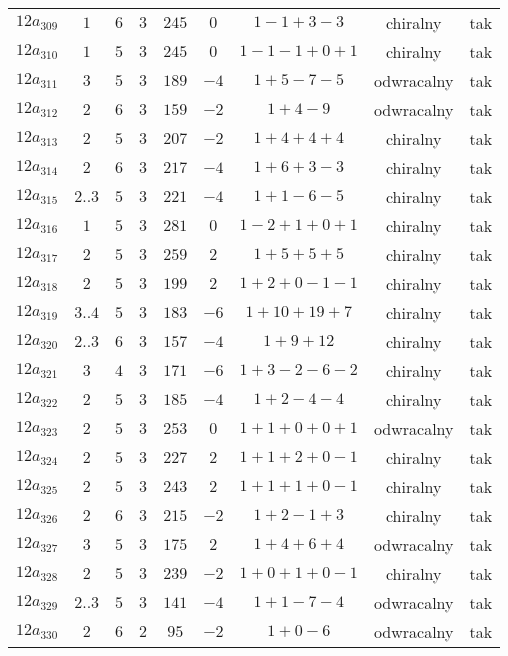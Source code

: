\begin{longtable}{ccccccccc}
$12a_{309}$ & $1$ & $6$ & $3$ & $245$ & $0$ & $1-1+3-3$ & chiralny & tak \\
$12a_{310}$ & $1$ & $5$ & $3$ & $245$ & $0$ & $1-1-1+0+1$ & chiralny & tak \\
$12a_{311}$ & $3$ & $5$ & $3$ & $189$ & $-4$ & $1+5-7-5$ & odwracalny & tak \\
$12a_{312}$ & $2$ & $6$ & $3$ & $159$ & $-2$ & $1+4-9$ & odwracalny & tak \\
$12a_{313}$ & $2$ & $5$ & $3$ & $207$ & $-2$ & $1+4+4+4$ & chiralny & tak \\
$12a_{314}$ & $2$ & $6$ & $3$ & $217$ & $-4$ & $1+6+3-3$ & chiralny & tak \\
$12a_{315}$ & $2..3$ & $5$ & $3$ & $221$ & $-4$ & $1+1-6-5$ & chiralny & tak \\
$12a_{316}$ & $1$ & $5$ & $3$ & $281$ & $0$ & $1-2+1+0+1$ & chiralny & tak \\
$12a_{317}$ & $2$ & $5$ & $3$ & $259$ & $2$ & $1+5+5+5$ & chiralny & tak \\
$12a_{318}$ & $2$ & $5$ & $3$ & $199$ & $2$ & $1+2+0-1-1$ & chiralny & tak \\
$12a_{319}$ & $3..4$ & $5$ & $3$ & $183$ & $-6$ & $1+10+19+7$ & chiralny & tak \\
$12a_{320}$ & $2..3$ & $6$ & $3$ & $157$ & $-4$ & $1+9+12$ & chiralny & tak \\
$12a_{321}$ & $3$ & $4$ & $3$ & $171$ & $-6$ & $1+3-2-6-2$ & chiralny & tak \\
$12a_{322}$ & $2$ & $5$ & $3$ & $185$ & $-4$ & $1+2-4-4$ & chiralny & tak \\
$12a_{323}$ & $2$ & $5$ & $3$ & $253$ & $0$ & $1+1+0+0+1$ & odwracalny & tak \\
$12a_{324}$ & $2$ & $5$ & $3$ & $227$ & $2$ & $1+1+2+0-1$ & chiralny & tak \\
$12a_{325}$ & $2$ & $5$ & $3$ & $243$ & $2$ & $1+1+1+0-1$ & chiralny & tak \\
$12a_{326}$ & $2$ & $6$ & $3$ & $215$ & $-2$ & $1+2-1+3$ & chiralny & tak \\
$12a_{327}$ & $3$ & $5$ & $3$ & $175$ & $2$ & $1+4+6+4$ & odwracalny & tak \\
$12a_{328}$ & $2$ & $5$ & $3$ & $239$ & $-2$ & $1+0+1+0-1$ & chiralny & tak \\
$12a_{329}$ & $2..3$ & $5$ & $3$ & $141$ & $-4$ & $1+1-7-4$ & odwracalny & tak \\
$12a_{330}$ & $2$ & $6$ & $2$ & $95$ & $-2$ & $1+0-6$ & odwracalny & tak \\

\end{longtable}
